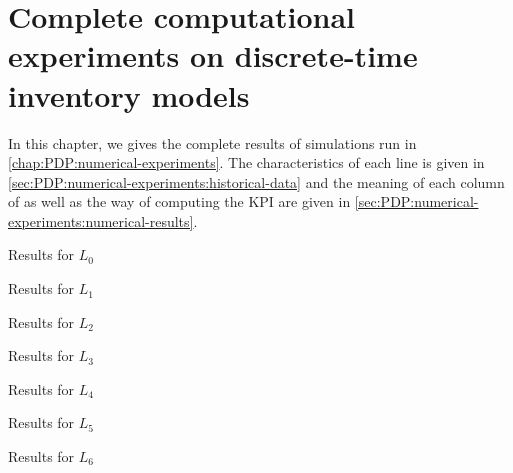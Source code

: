 \chapter{Complete computational experiments on discrete-time inventory models}
\label{chap:appendix:pdp:numerical-experiments}


In this chapter, we gives the complete results of simulations run in \cref{chap:PDP:numerical-experiments}.
The characteristics of each line is given in \cref{sec:PDP:numerical-experiments:historical-data} and the meaning of each column of  as well as the way of computing the KPI are given in \cref{sec:PDP:numerical-experiments:numerical-results}.


\begin{table}[!ht]

\caption{Results for $L_0$}
\label{tab:appendix:pdp:results:line-0}
\end{table}

\begin{table}[!ht]

\caption{Results for $L_1$}
\label{tab:appendix:pdp:results:line-1}
\end{table}

\begin{table}[!ht]

\caption{Results for $L_2$}
\label{tab:appendix:pdp:results:line-2}
\end{table}

\begin{table}[!ht]

\caption{Results for $L_3$}
\label{tab:appendix:pdp:results:line-3}
\end{table}

\begin{table}[!ht]

\caption{Results for $L_4$}
\label{tab:appendix:pdp:results:line-4}
\end{table}

\begin{table}[!ht]

\caption{Results for $L_5$}
\label{tab:appendix:pdp:results:line-5}
\end{table}

\begin{table}[!ht]

\caption{Results for $L_6$}
\label{tab:appendix:pdp:results:line-6}
\end{table}

\newpage
